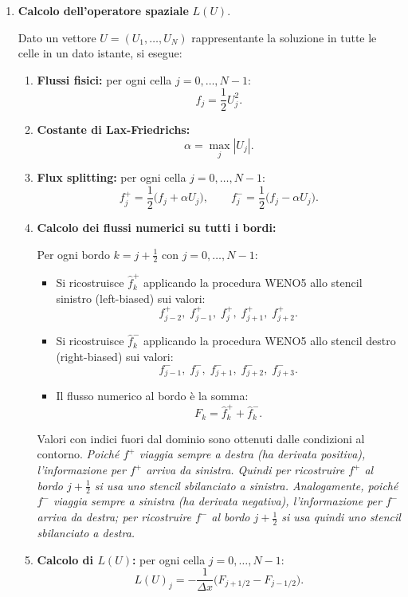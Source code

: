 \documentclass[12pt]{article}
\begin{document}
\begin{enumerate}
    \item \textbf{Calcolo dell'operatore spaziale} \(L(U)\).
    
    Dato un vettore \(U=(U_1,\dots,U_N)\) rappresentante la soluzione in tutte le celle in un dato istante, si esegue:
    
    \begin{enumerate}
        \item \textbf{Flussi fisici:} per ogni cella \(j=0,\dots,N-1\):
        \[
        f_j = \frac{1}{2} U_j^2.
        \]
        
        \item \textbf{Costante di Lax-Friedrichs:}
        \[
        \alpha = \max_{j} |U_j|.
        \]
        
        \item \textbf{Flux splitting:} per ogni cella \(j=0,\dots,N-1\):
        \[
        f^+_j = \frac{1}{2}\bigl(f_j + \alpha U_j\bigr), \qquad
        f^-_j = \frac{1}{2}\bigl(f_j - \alpha U_j\bigr).
        \]
        
        \item \textbf{Calcolo dei flussi numerici su tutti i bordi:}
        
        Per ogni bordo \(k = j+\tfrac12\) con \(j=0,\dots,N-1\):
        \begin{itemize}
            \item Si ricostruisce \(\hat f^+_{k}\) applicando la procedura WENO5 allo stencil sinistro (left-biased) sui valori:
            \[
            f^+_{j-2},\; f^+_{j-1},\; f^+_j,\; f^+_{j+1},\; f^+_{j+2}.
            \]
            \item Si ricostruisce \(\hat f^-_{k}\) applicando la procedura WENO5 allo stencil destro (right-biased) sui valori:
            \[
            f^-_{j-1},\; f^-_j,\; f^-_{j+1},\; f^-_{j+2},\; f^-_{j+3}.
            \]
            \item Il flusso numerico al bordo è la somma:
            \[
            F_{k} = \hat f^+_{k} + \hat f^-_{k}.
            \]
        \end{itemize}
        Valori con indici fuori dal dominio sono ottenuti dalle condizioni al contorno. \newline
        \textit{Poiché $f^+$ viaggia sempre a destra (ha derivata positiva), l'informazione per $f^+$ arriva da sinistra. Quindi per ricostruire $f^+$ al bordo $j+\tfrac12$ si usa uno stencil sbilanciato a sinistra. Analogamente, poiché $f^-$ viaggia sempre a sinistra (ha derivata negativa), l'informazione per $f^-$ arriva da destra; per ricostruire $f^-$ al bordo $j+\tfrac12$ si usa quindi uno stencil sbilanciato a destra.}
        \item \textbf{Calcolo di \(L(U)\):} per ogni cella \(j=0,\dots,N-1\):
        \[
        L(U)_j = -\frac{1}{\Delta x}\bigl(F_{j+1/2} - F_{j-1/2}\bigr).
        \]
    \end{enumerate}
    

\end{enumerate}
\end{document}
